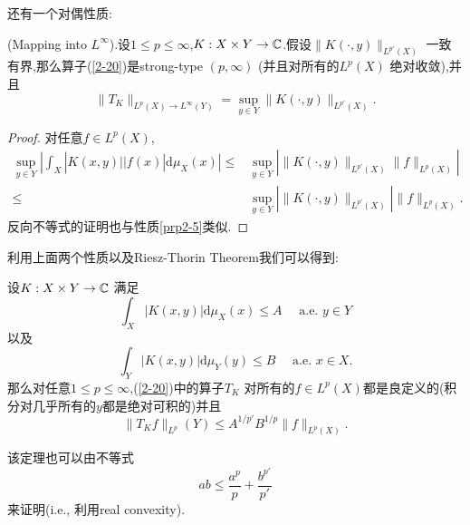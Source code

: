  还有一个对偶性质:
 \begin{proposition}
   (Mapping into $L^{\infty}$).设$1\le p\le \infty$,$K:X\times Y\to \mathbb{C}$.假设$\|K(\cdot ,y)\|_{L^{p'}(X)}$ 一致有界,那么算子{\normalfont (\ref{2-20})}是strong-type $(p,\infty)$ (并且对所有的$L^{p}(X)$ 绝对收敛),并且
   \begin{equation}
     \|T_K\|_{L^{p}(X)\to L^{\infty}(Y)}=\sup_{y\in Y}\|K(\cdot ,y)\|_{L^{p'}(X)}.
   \end{equation}
 \end{proposition}
\begin{proof}
  对任意$f\in L^{p}(X)$,
  \begin{align*}
    \sup_{y\in Y} | \int_{X}| K(x,y)| |f(x)| \mathrm{d}\mu_X(x)  |\le & \sup_{y\in Y} | \|K(\cdot ,y)\|_{L^{p'}(X)}\|f\|_{L^{p}(X)} |\\
    \le & \sup_{y\in Y}| \|K(\cdot ,y)\|_{L^{p'}(X)} | \|f\|_{L^{p}(X)}
  .\end{align*}
  反向不等式的证明也与性质\ref{prp2-5}类似.
\end{proof}
利用上面两个性质以及Riesz-Thorin Theorem我们可以得到:
\begin{theorem}
  设$K:X\times Y\to \mathbb{C}$ 满足
  \[
    \int_{X}|K(x,y)| \mathrm{d}\mu_X(x) \le A  \quad \text{ a.e. }y \in Y
  \]以及
  \[
    \int_{Y}|K(x,y)| \mathrm{d}\mu_{Y}(y)\le B \quad \text{ a.e. }x \in X.
  \]
  那么对任意$1\le p\le \infty$,{\normalfont (\ref{2-20})}中的算子$T_K$ 对所有的$f\in L^{p}(X)$都是良定义的(积分对几乎所有的$y$都是绝对可积的)并且
  \[
    \|T_Kf\|_{L^{p}}(Y)\le A^{1 /p'}B^{1 /p}\|f\|_{L^{p}(X)}.
  \] 
\end{theorem}
该定理也可以由不等式
\[
ab\le \frac{a^{p}}{p}+ \frac{b^{p'}}{p'}
\] 
来证明(i.e., 利用real convexity).
